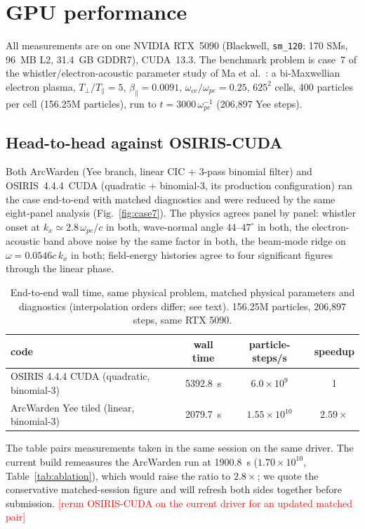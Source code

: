 \documentclass[11pt]{article}
\newcommand{\tocheck}[1]{\textcolor{red}{[#1]}}
\newcommand{\arcw}{ArcWarden}
\begin{document}
\section{GPU performance}
\label{sec:perf}

All measurements are on one NVIDIA RTX~5090 (Blackwell,
\texttt{sm\_120}: 170 SMs, \SI{96}{MB} L2, \SI{31.4}{GB} GDDR7),
CUDA~13.3. The benchmark problem is case~7 of the
whistler/electron-acoustic parameter study of Ma et al.~\cite{ma2024}:
a bi-Maxwellian electron plasma, $T_\perp/T_\parallel=5$,
$\beta_\parallel=0.0091$, $\omega_{ce}/\omega_{pe}=0.25$, $625^2$ cells,
400 particles per cell (156.25M particles), run to
$t=3000\,\omega_{pe}^{-1}$ (206{,}897 Yee steps).

\subsection{Head-to-head against OSIRIS-CUDA}
\label{sec:headtohead}
Both \arcw{} (Yee branch, linear CIC + 3-pass binomial filter) and
OSIRIS~4.4.4~CUDA (quadratic + binomial-3, its production
configuration) ran the case end-to-end with matched diagnostics and
were reduced by the same eight-panel analysis
(Fig.~\ref{fig:case7}). The physics agrees panel by panel: whistler
onset at $k_x\simeq2.8\,\omega_{pe}/c$ in both, wave-normal angle
$44$--$47^\circ$ in both, the electron-acoustic band above noise by the
same factor in both, the beam-mode ridge on $\omega=0.0546c\,k_x$ in
both; field-energy histories agree to four significant figures through
the linear phase.

\begin{table}[htbp]
\centering
\caption{End-to-end wall time, same physical problem, matched physical
parameters and diagnostics (interpolation orders differ; see text).
156.25M particles, 206{,}897 steps, same RTX 5090.}
\label{tab:headtohead}
\begin{tabular}{lccc}
\toprule
code & wall time & particle-steps/s & speedup\\
\midrule
OSIRIS 4.4.4 CUDA (quadratic, binomial-3) & \SI{5392.8}{s} & $6.0\times10^{9}$ & 1\\
\arcw{} Yee tiled (linear, binomial-3)     & \SI{2079.7}{s} & $1.55\times10^{10}$ & $2.59\times$\\
\bottomrule
\end{tabular}
\end{table}

The table pairs measurements taken in the same session on the same
driver. The current build remeasures the \arcw{} run at \SI{1900.8}{s}
($1.70\times10^{10}$, Table~\ref{tab:ablation}), which would raise the
ratio to $2.8\times$; we quote the conservative matched-session figure
and will refresh both sides together before submission.
\tocheck{rerun OSIRIS-CUDA on the current driver for an updated
matched pair}
\end{document}
